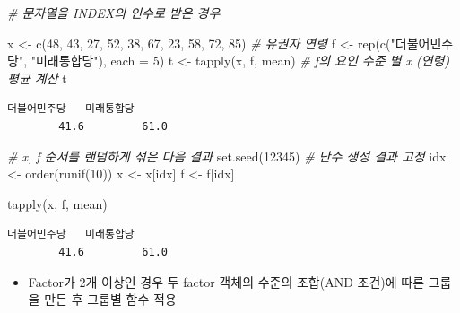 \documentclass[
  11pt,
]{krantz}
\newenvironment{Shaded}{\begin{snugshade}}{\end{snugshade}}
\newcommand{\AttributeTok}[1]{\textcolor[rgb]{0.61,0.61,0.61}{#1}}
\newcommand{\CommentTok}[1]{\textcolor[rgb]{0.37,0.37,0.37}{\textit{#1}}}
\newcommand{\DecValTok}[1]{\textcolor[rgb]{0.06,0.06,0.06}{#1}}
\newcommand{\FunctionTok}[1]{\textcolor[rgb]{0,0,0}{#1}}
\newcommand{\NormalTok}[1]{#1}
\newcommand{\OtherTok}[1]{\textcolor[rgb]{0.37,0.37,0.37}{#1}}
\newcommand{\StringTok}[1]{\textcolor[rgb]{0.5,0.5,0.5}{#1}}
\providecommand{\tightlist}{%
  \setlength{\itemsep}{0pt}\setlength{\parskip}{0pt}}
\begin{document}
\begin{Shaded}
\begin{Highlighting}[]
\CommentTok{\# 문자열을 INDEX의 인수로 받은 경우}

\NormalTok{x }\OtherTok{\textless{}{-}} \FunctionTok{c}\NormalTok{(}\DecValTok{48}\NormalTok{, }\DecValTok{43}\NormalTok{, }\DecValTok{27}\NormalTok{, }\DecValTok{52}\NormalTok{, }\DecValTok{38}\NormalTok{, }
       \DecValTok{67}\NormalTok{, }\DecValTok{23}\NormalTok{, }\DecValTok{58}\NormalTok{, }\DecValTok{72}\NormalTok{, }\DecValTok{85}\NormalTok{) }\CommentTok{\# 유권자 연령}
\NormalTok{f }\OtherTok{\textless{}{-}} \FunctionTok{rep}\NormalTok{(}\FunctionTok{c}\NormalTok{(}\StringTok{"더불어민주당"}\NormalTok{, }\StringTok{"미래통합당"}\NormalTok{), }\AttributeTok{each =} \DecValTok{5}\NormalTok{)}
\NormalTok{t }\OtherTok{\textless{}{-}} \FunctionTok{tapply}\NormalTok{(x, f, mean) }\CommentTok{\# f의 요인 수준 별 x (연령) 평균 계산}
\NormalTok{t}
\end{Highlighting}
\end{Shaded}

\begin{verbatim}
더불어민주당   미래통합당 
        41.6         61.0 
\end{verbatim}

\begin{Shaded}
\begin{Highlighting}[]
\CommentTok{\# x, f 순서를 랜덤하게 섞은 다음 결과}
\FunctionTok{set.seed}\NormalTok{(}\DecValTok{12345}\NormalTok{) }\CommentTok{\# 난수 생성 결과 고정}
\NormalTok{idx }\OtherTok{\textless{}{-}} \FunctionTok{order}\NormalTok{(}\FunctionTok{runif}\NormalTok{(}\DecValTok{10}\NormalTok{))}
\NormalTok{x }\OtherTok{\textless{}{-}}\NormalTok{ x[idx]}
\NormalTok{f }\OtherTok{\textless{}{-}}\NormalTok{ f[idx]}

\FunctionTok{tapply}\NormalTok{(x, f, mean)}
\end{Highlighting}
\end{Shaded}

\begin{verbatim}
더불어민주당   미래통합당 
        41.6         61.0 
\end{verbatim}

\normalsize

\begin{itemize}
\tightlist
\item
  Factor가 2개 이상인 경우 두 factor 객체의 수준의 조합(AND 조건)에 따른 그룹을 만든 후 그룹별 함수 적용
\end{itemize}
\end{document}

